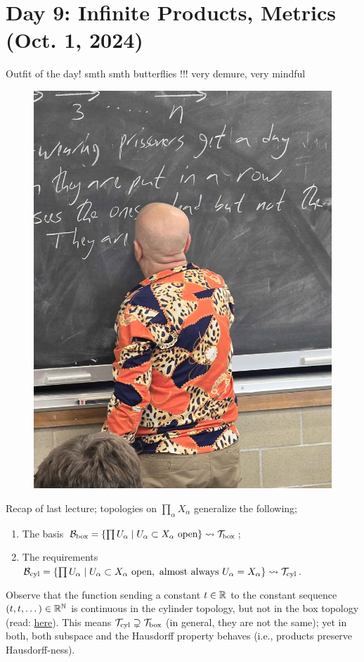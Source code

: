\section{Day 9: Infinite Products, Metrics (Oct. 1, 2024)}
Outfit of the day! smth smth butterflies !!! very demure, very mindful
\begin{figure}[h]
    \centering
    \includegraphics[scale=0.1]{MAT327 Notes/Dror Shirts/dror day 9 shirt.jpg}
\end{figure}

\noindent Recap of last lecture; topologies on $\prod_\alpha X_\alpha$ generalize the following;
\begin{enumerate}[label=(\alph*)]
    \item The basis $\mathcal B_\mathrm{box} = \{\prod U_\alpha \mid U_\alpha \subset X_\alpha \text{ open}\} \rightsquigarrow \mathcal T_\mathrm{box}$;
    \item The requirements $\mathcal B_\mathrm{cyl} = \{\prod U_\alpha \mid U_\alpha \subset X_\alpha \text{ open}, \text{ almost always } U_\alpha = X_\alpha\} \rightsquigarrow \mathcal T_\mathrm{cyl}$.
\end{enumerate}
Observe that the function sending a constant $t \in \mathbb R$ to the constant sequence $(t, t, \dots) \in \mathbb R^\mathbb N$ is continuous in the cylinder topology, but not in the box topology (read: \href{https://en.wikipedia.org/wiki/Box_topology#Example_%E2%80%94_failure_of_continuity}{here}). This means $\mathcal T_\mathrm{cyl} \supsetneq \mathcal T_\mathrm{box}$ (in general, they are not the same); yet in both, both subspace and the Hausdorff property behaves (i.e., products preserve Hausdorff-ness).

